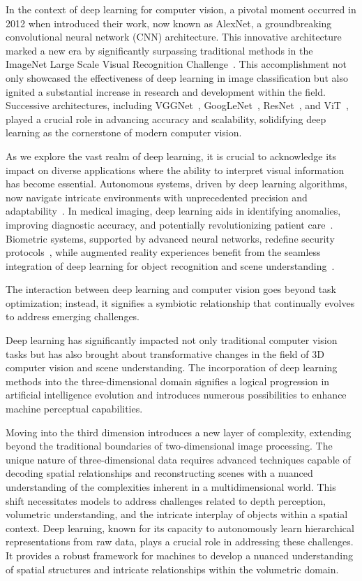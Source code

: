 In the context of deep learning for computer vision, a pivotal moment occurred in 2012 when \cite{krizhevsky2012imagenet} introduced their work, now known as AlexNet, a groundbreaking convolutional neural network (CNN) architecture. This innovative architecture marked a new era by significantly surpassing traditional methods in the ImageNet Large Scale Visual Recognition Challenge~\citep{ILSVRC15}. This accomplishment not only showcased the effectiveness of deep learning in image classification but also ignited a substantial increase in research and development within the field. Successive architectures, including VGGNet~\citep{Simonyan15}, GoogLeNet~\citep{szegedy2015going}, ResNet~\citep{he2016deep}, and ViT~\citep{dosovitskiy2021an}, played a crucial role in advancing accuracy and scalability, solidifying deep learning as the cornerstone of modern computer vision.

As we explore the vast realm of deep learning, it is crucial to acknowledge its impact on diverse applications where the ability to interpret visual information has become essential. Autonomous systems, driven by deep learning algorithms, now navigate intricate environments with unprecedented precision and adaptability~\citep{chib2023recent}. In medical imaging, deep learning aids in identifying anomalies, improving diagnostic accuracy, and potentially revolutionizing patient care~\citep{suganyadevi2022review}. Biometric systems, supported by advanced neural networks, redefine security protocols~\citep{jadhav2022review}, while augmented reality experiences benefit from the seamless integration of deep learning for object recognition and scene understanding~\citep{ghasemi2022deep}.

The interaction between deep learning and computer vision goes beyond task optimization; instead, it signifies a symbiotic relationship that continually evolves to address emerging challenges.

Deep learning has significantly impacted not only traditional computer vision tasks but has also brought about transformative changes in the field of 3D computer vision and scene understanding. The incorporation of deep learning methods into the three-dimensional domain signifies a logical progression in artificial intelligence evolution and introduces numerous possibilities to enhance machine perceptual capabilities.

Moving into the third dimension introduces a new layer of complexity, extending beyond the traditional boundaries of two-dimensional image processing. The unique nature of three-dimensional data requires advanced techniques capable of decoding spatial relationships and reconstructing scenes with a nuanced understanding of the complexities inherent in a multidimensional world. This shift necessitates models to address challenges related to depth perception, volumetric understanding, and the intricate interplay of objects within a spatial context. Deep learning, known for its capacity to autonomously learn hierarchical representations from raw data, plays a crucial role in addressing these challenges. It provides a robust framework for machines to develop a nuanced understanding of spatial structures and intricate relationships within the volumetric domain.

